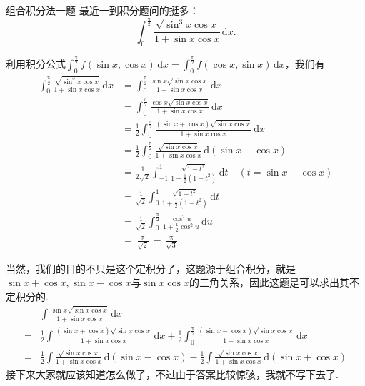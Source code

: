 \documentclass[UTF8,no-math,12pt,openany,table,dvipsnames,svgnames]{book}
\renewcommand{\pi}{\uppi}
\newcommand{\hei}{\CJKfamily{hei}}
\newenvironment{solve}{\par\indent{\hei 解}\hspace{1em}}{\par}
\begin{document}
\begin{MYBOX}[colbacktitle=blue]{组合积分法一题}
  最近一到积分题问的挺多：
  \[
    \int_0^{\frac\pi2}\frac{\sqrt{\sin^3x\cos x}}{1+\sin x\cos x}\,\mathrm dx.
  \]
  \tcblower
  \begin{solve}
    利用积分公式$\int_0^{\frac\pi2}f(\sin x,\cos x)\,\mathrm dx
    =\int_0^{\frac\pi2}f(\cos x,\sin x)\,\mathrm dx$，我们有
    \begin{align*}
      \int_0^{\frac\pi2}\frac{\sqrt{\sin^3x\cos x}}{1+\sin x\cos x}\,\mathrm dx & = \int_0^{\frac\pi2}\frac{\sin x\sqrt{\sin x\cos x}}{1+\sin x\cos x}\,\mathrm dx\\
      & = \int_0^{\frac\pi2}\frac{\cos x\sqrt{\sin x\cos x}}{1+\sin x\cos x}\,\mathrm dx\\
      & = \frac12\int_0^{\frac\pi2}\frac{(\sin x+\cos x)\sqrt{\sin x\cos x}}{1+\sin x\cos x}\,\mathrm dx \\
      & = \frac12\int_0^{\frac\pi2} \frac{\sqrt{\sin x\cos x}}{1+\sin x\cos x}\,\mathrm d(\sin x-\cos x)\\
      & = \frac1{2\sqrt2}\int_{-1}^1\frac{\sqrt{1-t^2}}{1+\frac12(1-t^2)}
      \,\mathrm dt\quad (t=\sin x-\cos x)\\
      & = \frac1{\sqrt2}\int_0^1\frac{\sqrt{1-t^2}}{1+\frac12(1-t^2)}
      \,\mathrm dt \\
      & = \frac1{\sqrt2}\int_0^{\frac\pi2}\frac{\cos^2u}{1+\frac12\cos^2u}
      \,\mathrm du\\
      & = \frac\pi{\sqrt2}-\frac\pi{\sqrt3}.
    \end{align*}
  \end{solve}
  \tcbline
  当然，我们的目的不只是这个定积分了，这题源于组合积分，就是$\sin x+\cos x,\sin x-\cos x$与$\sin x\cos x$的三角关系，因此这题是可以求出其不定积分的.
  \begin{align*}
   & \int\frac{\sin x\sqrt{\sin x\cos x}}{1+\sin x\cos x}\,\mathrm dx\\
   ={}& \frac12 \int\frac{(\sin x+\cos x)\sqrt{\sin x\cos x}}{1+\sin x\cos x}\,\mathrm dx + \frac12 \int_0^{\frac\pi2}\frac{(\sin x-\cos x)\sqrt{\sin x\cos x}}{1+\sin x\cos x}\,\mathrm dx\\
   ={}& \frac12\int\frac{\sqrt{\sin x\cos x}}{1+\sin x\cos x}\,\mathrm d(\sin x-\cos x) -
   \frac12\int\frac{\sqrt{\sin x\cos x}}{1+\sin x\cos x}\,\mathrm d(\sin x+\cos x)
  \end{align*}
  接下来大家就应该知道怎么做了，不过由于答案比较惊骇，我就不写下去了.
\end{MYBOX}
\end{document}
